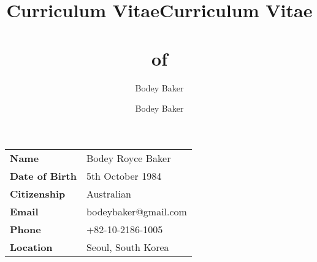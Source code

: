 \documentclass[10pt, a4paper]{report}
\title{Curriculum Vitae}
\author{Bodey Baker}
\title{Curriculum Vitae\\~\\of}
\author{Bodey Baker}%
\begin{document}


\begin{minipage}{0.82\linewidth}
\begin{tabular}{ll}
{\bf Name} & Bodey Royce Baker \\ 
{\bf Date of Birth} & 5th October 1984 \\
{\bf Citizenship} & Australian \\
{\bf Email} & bodeybaker@gmail.com \\
{\bf Phone} & +82-10-2186-1005 \\
{\bf Location} & Seoul, South Korea \\

\end{tabular}
\end{minipage}
\hfill
\begin{minipage}{0.6\linewidth}
{%
\setlength{\fboxsep}{0pt}%
\setlength{\fboxrule}{1pt}%
}%
\end{minipage}
\end{document}

